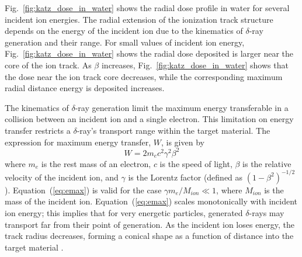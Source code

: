 Fig.~\ref{fig:katz_dose_in_water} shows the radial dose profile in water for several incident ion energies. 
The radial extension of the ionization track structure depends on the energy of the incident ion due to the kinematics of $\delta$-ray generation and their range.
For small values of incident ion energy, Fig.~\ref{fig:katz_dose_in_water} shows the radial dose deposited is larger near the core of the ion track. 
As $\beta$ increases, Fig.~\ref{fig:katz_dose_in_water} shows that the dose near the ion track core decreases, while the corresponding maximum radial distance energy is deposited increases.

The kinematics of $\delta$-ray generation limit the maximum energy transferable in a collision between an incident ion and a single electron. 
This limitation on energy transfer restricts a $\delta$-ray's transport range within the target material. 
The expression for maximum energy transfer, $W$, is given by
\begin{equation}
    \label{eq:emax}
    W = 2m_{e}c^2\gamma^2\beta^2
\end{equation}
where $m_e$ is the rest mass of an electron, $c$ is the speed of light, $\beta$ is the relative velocity of the incident ion, and $\gamma$ is the Lorentz factor (defined as $(1-\beta^2)^{-1/2}$).
Equation~(\ref{eq:emax}) is valid for the case $\gamma m_e / M_{ion} \ll 1$, where $M_{ion}$ is the mass of the incident ion. 
Equation~(\ref{eq:emax}) scales monotonically with incident ion energy; this implies that for very energetic particles, generated $\delta$-rays may transport far from their point of generation.
As the incident ion loses energy, the track radius decreases, forming a conical shape as a function of distance into the target material \cite{Stapor:1988ws}.

